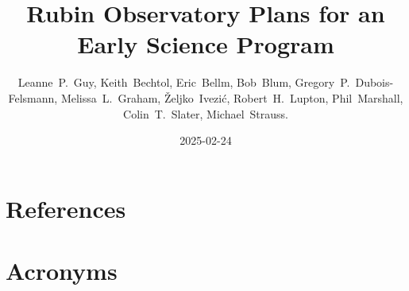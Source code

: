 \documentclass[DM,authoryear,toc]{lsstdoc}
\title{Rubin Observatory Plans for an Early Science Program}
\author{%
Leanne~P.~Guy, Keith~Bechtol, Eric~Bellm, Bob~Blum, Gregory~P.~Dubois-Felsmann, Melissa~L.~Graham,
\v{Z}eljko~Ivezi\'{c}, Robert~H.~Lupton, Phil~Marshall, Colin~T.~Slater, Michael~Strauss.}
\date{2025-02-24}
\begin{document}
\maketitle










\appendix
\section{References} \label{sec:bib}
\renewcommand{\refname}{} %


\section{Acronyms} \label{sec:acronyms}

\end{document}
